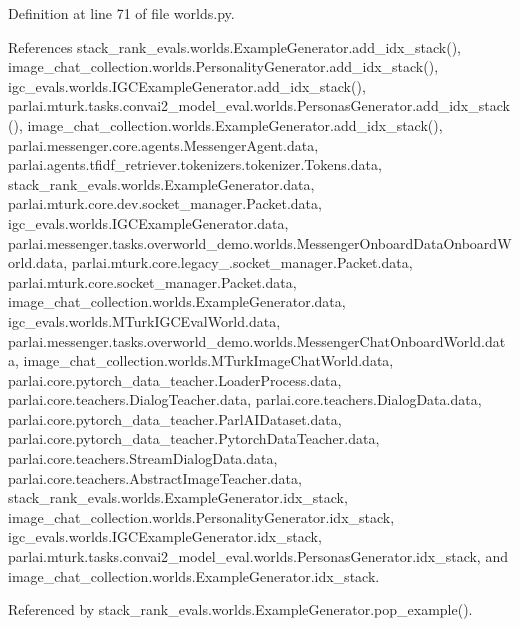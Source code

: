 Definition at line 71 of file worlds.\+py.



References stack\+\_\+rank\+\_\+evals.\+worlds.\+Example\+Generator.\+add\+\_\+idx\+\_\+stack(), image\+\_\+chat\+\_\+collection.\+worlds.\+Personality\+Generator.\+add\+\_\+idx\+\_\+stack(), igc\+\_\+evals.\+worlds.\+I\+G\+C\+Example\+Generator.\+add\+\_\+idx\+\_\+stack(), parlai.\+mturk.\+tasks.\+convai2\+\_\+model\+\_\+eval.\+worlds.\+Personas\+Generator.\+add\+\_\+idx\+\_\+stack(), image\+\_\+chat\+\_\+collection.\+worlds.\+Example\+Generator.\+add\+\_\+idx\+\_\+stack(), parlai.\+messenger.\+core.\+agents.\+Messenger\+Agent.\+data, parlai.\+agents.\+tfidf\+\_\+retriever.\+tokenizers.\+tokenizer.\+Tokens.\+data, stack\+\_\+rank\+\_\+evals.\+worlds.\+Example\+Generator.\+data, parlai.\+mturk.\+core.\+dev.\+socket\+\_\+manager.\+Packet.\+data, igc\+\_\+evals.\+worlds.\+I\+G\+C\+Example\+Generator.\+data, parlai.\+messenger.\+tasks.\+overworld\+\_\+demo.\+worlds.\+Messenger\+Onboard\+Data\+Onboard\+World.\+data, parlai.\+mturk.\+core.\+legacy\+\_.\+socket\+\_\+manager.\+Packet.\+data, parlai.\+mturk.\+core.\+socket\+\_\+manager.\+Packet.\+data, image\+\_\+chat\+\_\+collection.\+worlds.\+Example\+Generator.\+data, igc\+\_\+evals.\+worlds.\+M\+Turk\+I\+G\+C\+Eval\+World.\+data, parlai.\+messenger.\+tasks.\+overworld\+\_\+demo.\+worlds.\+Messenger\+Chat\+Onboard\+World.\+data, image\+\_\+chat\+\_\+collection.\+worlds.\+M\+Turk\+Image\+Chat\+World.\+data, parlai.\+core.\+pytorch\+\_\+data\+\_\+teacher.\+Loader\+Process.\+data, parlai.\+core.\+teachers.\+Dialog\+Teacher.\+data, parlai.\+core.\+teachers.\+Dialog\+Data.\+data, parlai.\+core.\+pytorch\+\_\+data\+\_\+teacher.\+Parl\+A\+I\+Dataset.\+data, parlai.\+core.\+pytorch\+\_\+data\+\_\+teacher.\+Pytorch\+Data\+Teacher.\+data, parlai.\+core.\+teachers.\+Stream\+Dialog\+Data.\+data, parlai.\+core.\+teachers.\+Abstract\+Image\+Teacher.\+data, stack\+\_\+rank\+\_\+evals.\+worlds.\+Example\+Generator.\+idx\+\_\+stack, image\+\_\+chat\+\_\+collection.\+worlds.\+Personality\+Generator.\+idx\+\_\+stack, igc\+\_\+evals.\+worlds.\+I\+G\+C\+Example\+Generator.\+idx\+\_\+stack, parlai.\+mturk.\+tasks.\+convai2\+\_\+model\+\_\+eval.\+worlds.\+Personas\+Generator.\+idx\+\_\+stack, and image\+\_\+chat\+\_\+collection.\+worlds.\+Example\+Generator.\+idx\+\_\+stack.



Referenced by stack\+\_\+rank\+\_\+evals.\+worlds.\+Example\+Generator.\+pop\+\_\+example().

